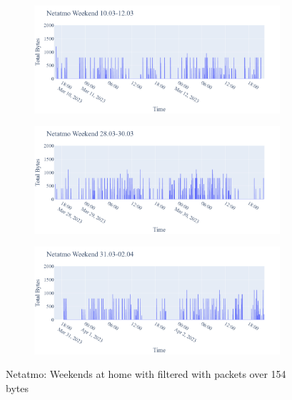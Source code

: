 \begin{figure}[H]
\begin{subfigure}[b]{0.47\textwidth}
    \end{subfigure}
    \begin{subfigure}[b]{0.47\textwidth}
        \includegraphics[width=1.1\hsize]{figures/Netatmo_Weekend_BigBytes_10.03-12.03.png}
    \end{subfigure}
    \begin{subfigure}[b]{0.47\textwidth}
        \includegraphics[width=1.1\hsize]{figures/Netatmo_Weekend_BigBytes_28.03-30.03.png}
    \end{subfigure}
    \begin{subfigure}[b]{0.47\textwidth}
        \includegraphics[width=1.1\hsize]{figures/Netatmo_Weekend_BigBytes_31.03-02.04.png}
    \end{subfigure}
    \caption{Netatmo: Weekends at home with filtered with packets over 154 bytes}
    \label{fig:NetatmoBigPackets}
\end{figure}

